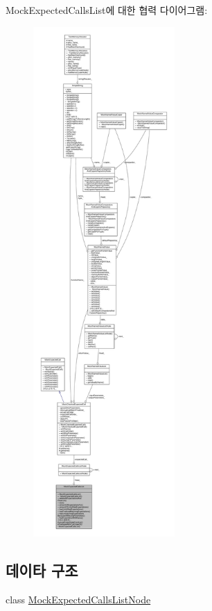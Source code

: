 Mock\+Expected\+Calls\+List에 대한 협력 다이어그램\+:
\nopagebreak
\begin{figure}[H]
\begin{center}
\leavevmode
\includegraphics[height=550pt]{class_mock_expected_calls_list__coll__graph}
\end{center}
\end{figure}
\subsection*{데이타 구조}
\begin{DoxyCompactItemize}
\item 
class \hyperlink{class_mock_expected_calls_list_1_1_mock_expected_calls_list_node}{Mock\+Expected\+Calls\+List\+Node}
\end{DoxyCompactItemize}
